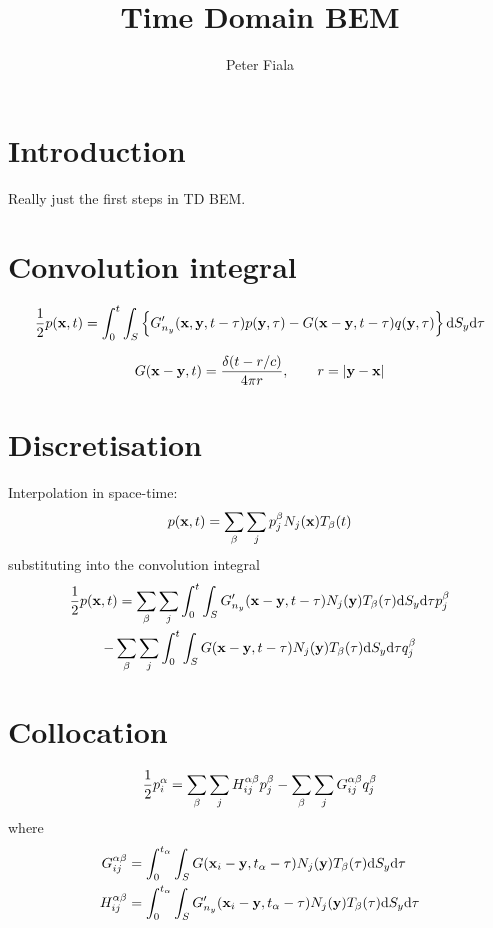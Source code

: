 \documentclass[a4paper,11pt,twoside]{paper}
\title{Time Domain BEM}
\author{Peter Fiala}
\newcommand{\td}{\mathrm{d}}
\begin{document}
\maketitle

\tableofcontents

\section{Introduction}

Really just the first steps in TD BEM.

\section{Convolution integral}

\begin{equation}
\frac{1}{2}p({\bf x}, t) =
\int_{0}^{t}
\int_{S}
\left\{
G'_{n_y}({\bf x},{\bf y}, t-\tau) p({\bf y}, \tau)
-
G({\bf x}-{\bf y}, t-\tau) q({\bf y}, \tau)
\right\}
\td S_{y}
\td \tau
\end{equation}

\begin{equation}
G({\bf x}-{\bf y}, t) = \frac{\delta(t-r/c)}{4\pi r}, \qquad r = |{\bf y}-{\bf x}|
\end{equation}

\section{Discretisation}

Interpolation in space-time:
%
\begin{equation}
p({\bf x}, t) =
\sum_{\beta} \sum_j
p^{\beta}_{j} N_j({\bf x}) T_{\beta}(t)
\end{equation}
%
substituting into the convolution integral
%
\begin{multline}
\frac{1}{2}p({\bf x}, t) =
\sum_{\beta} \sum_j 
\int_{0}^{t} \int_{S}
G'_{n_y}({\bf x}-{\bf y}, t-\tau)
N_j({\bf y}) T_{\beta}(\tau)
\td S_{y} \td \tau
p^{\beta}_{j} \\
-
\sum_{\beta} \sum_j 
\int_{0}^{t} \int_{S}
G({\bf x}-{\bf y}, t-\tau)
N_j({\bf y}) T_{\beta}(\tau)
\td S_{y} \td \tau
q^{\beta}_{j} 
\end{multline}

\section{Collocation}


\begin{equation}
\frac{1}{2}p_{i}^{\alpha} =
\sum_{\beta} \sum_j 
H_{ij}^{\alpha \beta}
p^{\beta}_{j} \\
-
\sum_{\beta} \sum_j 
G_{ij}^{\alpha \beta}
q^{\beta}_{j} 
\end{equation}
%
where
%
\begin{align}
G_{ij}^{\alpha \beta} &=
\int_{0}^{t_{\alpha}} \int_{S}
G({\bf x}_i-{\bf y}, t_{\alpha}-\tau)
N_j({\bf y}) T_{\beta}(\tau)
\td S_{y} \td \tau
\nonumber \\
H_{ij}^{\alpha \beta} &=
\int_{0}^{t_{\alpha}} \int_{S}
G'_{n_y}({\bf x}_i-{\bf y}, t_{\alpha}-\tau)
N_j({\bf y}) T_{\beta}(\tau)
\td S_{y} \td \tau
\end{align}
\end{document}
